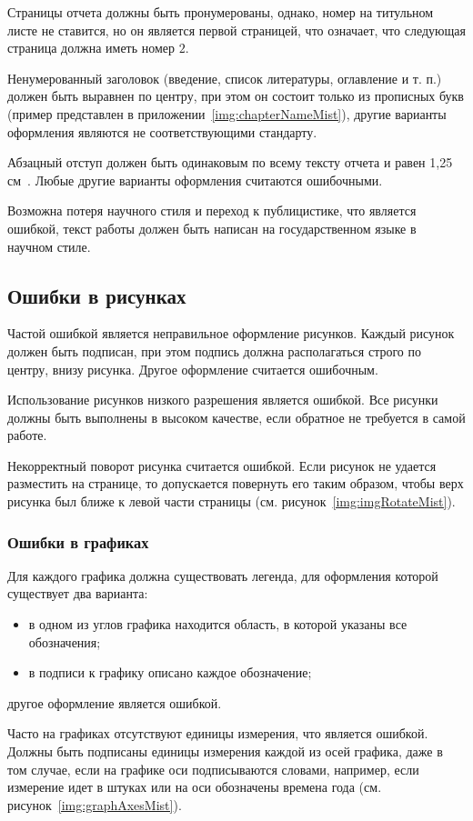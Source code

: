 \begin{appendices}
	Страницы отчета должны быть пронумерованы, однако, номер на титульном листе не ставится, но он является первой страницей, что означает, что следующая страница должна иметь номер ${2}$.
	
	Ненумерованный заголовок (введение, список литературы, оглавление и т. п.) должен быть выравнен по центру, при этом он состоит только из прописных букв (пример представлен в приложении~\ref{img:chapterNameMist}), другие варианты оформления являются не соответствующими стандарту.
	
	Абзацный отступ должен быть одинаковым по всему тексту отчета и равен 1,25 см~\cite{GOST732}. Любые другие варианты оформления считаются ошибочными.
	
	Возможна потеря научного стиля и переход к публицистике, что является ошибкой, текст работы должен быть написан на государственном языке в научном стиле.
	
	\subsection{Ошибки в рисунках}
	Частой ошибкой является неправильное оформление рисунков. Каждый рисунок должен быть подписан, при этом подпись должна располагаться строго по центру, внизу рисунка. Другое оформление считается ошибочным.
	
	Использование рисунков низкого разрешения является ошибкой. Все рисунки должны быть выполнены в высоком качестве, если обратное не требуется в самой работе.
	
	Некорректный поворот рисунка считается ошибкой. Если рисунок не удается разместить на странице, то допускается повернуть его таким образом, чтобы верх рисунка был ближе к левой части страницы (см. рисунок~\ref{img:imgRotateMist}).
	
	\subsubsection{Ошибки в графиках}
	Для каждого графика должна существовать легенда, для оформления которой существует два варианта:
	\begin{itemize}
		\item в одном из углов графика находится область, в которой указаны все обозначения;
		\item в подписи к графику описано каждое обозначение;
	\end{itemize}
	другое оформление является ошибкой.
	
	Часто на графиках отсутствуют единицы измерения, что является ошибкой. Должны быть подписаны единицы измерения каждой из осей графика, даже в том случае, если на графике оси подписываются словами, например, если измерение идет в штуках или на оси обозначены времена года (см. рисунок~\ref{img:graphAxesMist}).
	

\end{appendices}
